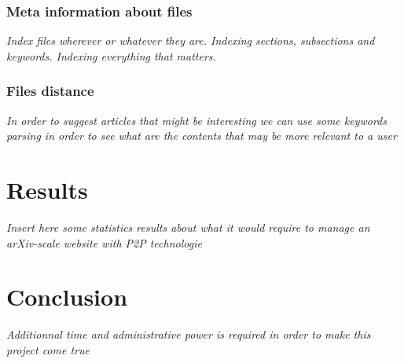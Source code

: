 \subsubsection{Meta information about files}

\textit{Index files wherever or whatever they are. Indexing sections, subsections
and keywords. Indexing everything that matters.}

\subsubsection{Files distance}

\textit{In order to suggest articles that might be interesting we can use
some keywords parsing in order to see what are the contents that may be more
relevant to a user}

\section{Results}

\textit{Insert here some statistics results about what 
it would require to manage an arXiv-scale website with P2P technologie}

\section{Conclusion}

\textit{Additionnal time and administrative power is required in order to
make this project come true}

